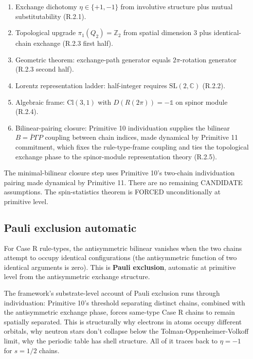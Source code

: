 \documentclass[11pt,a4paper]{article}
\begin{document}
\begin{enumerate}[noitemsep]
\item Exchange dichotomy $\eta \in \{+1, -1\}$ from involutive structure plus mutual substitutability (R.2.1).
\item Topological upgrade $\pi_1(Q_2) = \mathbb{Z}_2$ from spatial dimension 3 plus identical-chain exchange (R.2.3 first half).
\item Geometric theorem: exchange-path generator equals $2\pi$-rotation generator (R.2.3 second half).
\item Lorentz representation ladder: half-integer requires $\mathrm{SL}(2,\mathbb{C})$ (R.2.2).
\item Algebraic frame: $\mathrm{Cl}(3,1)$ with $D(R(2\pi)) = -\mathbb{1}$ on spinor module (R.2.4).
\item Bilinear-pairing closure: Primitive 10 individuation supplies the bilinear $B = \bar P \Gamma P$ coupling between chain indices, made dynamical by Primitive 11 commitment, which fixes the rule-type-frame coupling and ties the topological exchange phase to the spinor-module representation theory (R.2.5).
\end{enumerate}

The minimal-bilinear closure step uses Primitive 10's two-chain individuation pairing made dynamical by Primitive 11. There are no remaining CANDIDATE assumptions. The spin-statistics theorem is FORCED unconditionally at primitive level.

\subsection{Pauli exclusion automatic}

For Case R rule-types, the antisymmetric bilinear vanishes when the two chains attempt to occupy identical configurations (the antisymmetric function of two identical arguments is zero). This is \textbf{Pauli exclusion}, automatic at primitive level from the antisymmetric exchange structure.

The framework's substrate-level account of Pauli exclusion runs through individuation: Primitive 10's threshold separating distinct chains, combined with the antisymmetric exchange phase, forces same-type Case R chains to remain spatially separated. This is structurally why electrons in atoms occupy different orbitals, why neutron stars don't collapse below the Tolman-Oppenheimer-Volkoff limit, why the periodic table has shell structure. All of it traces back to $\eta = -1$ for $s = 1/2$ chains.
\end{document}

